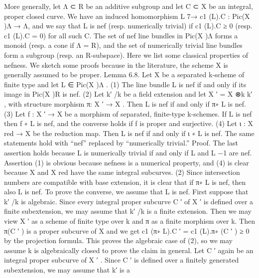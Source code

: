 \documentclass[
  10pt,
]{article}
\newenvironment{Shaded}{}{}
\newcommand{\NormalTok}[1]{#1}
\begin{document}
\begin{Shaded}
\begin{Highlighting}[]
\NormalTok{   More generally, let Λ ⊂ R be an additive subgroup and let C ⊂ X be an integral, proper}
\NormalTok{closed curve. We have an induced homomorphism L 7→ c1 (L).C : Pic(X )Λ → Λ, and we}
\NormalTok{say that L is nef (resp. numerically trivial) if c1 (L).C ≥ 0 (resp. c1 (L).C = 0) for all such C.}
\NormalTok{   The set of nef line bundles in Pic(X )Λ forms a monoid (resp. a cone if Λ = R), and the}
\NormalTok{set of numerically trivial line bundles form a subgroup (resp. an R{-}subspace).}
\NormalTok{  Here we list some classical properties of nefness. We sketch some proofs because in}
\NormalTok{the literature, the scheme X is generally assumed to be proper.}
\NormalTok{Lemma 6.8. Let X be a separated k{-}scheme of finite type and let L ∈ Pic(X )Λ .}
\NormalTok{    (1) The line bundle L is nef if and only if its image in Pic(X )R is nef.}
\NormalTok{    (2) Let k′ /k be a field extension and let X ′ = X ⊗k k′ , with structure morphism π: X ′ →}
\NormalTok{        X . Then L is nef if and only if π∗ L is nef.}
\NormalTok{    (3) Let f : X ′ → X be a morphism of separated, finite{-}type k{-}schemes. If L is nef then}
\NormalTok{        f ∗ L is nef, and the converse holds if f is proper and surjective.}
\NormalTok{    (4) Let ι : X red → X be the reduction map. Then L is nef if and only if ι ∗ L is nef.}
\NormalTok{The same statements hold with “nef” replaced by “numerically trivial.”}
\NormalTok{Proof. The last assertion holds because L is numerically trivial if and only if L and L −1}
\NormalTok{are nef. Assertion (1) is obvious because nefness is a numerical property, and (4) is clear}
\NormalTok{because X and X red have the same integral subcurves.}
\NormalTok{   (2) Since intersection numbers are compatible with base extension, it is clear that}
\NormalTok{if π∗ L is nef, then also L is nef. To prove the converse, we assume that L is nef. First}
\NormalTok{suppose that k′ /k is algebraic. Since every integral proper subcurve C ′ of X ′ is defined}
\NormalTok{over a finite subextension, we may assume that k′ /k is a finite extension. Then we may}
\NormalTok{view X ′ as a scheme of finite type over k and π as a finite morphism over k. Then π(C ′ )}
\NormalTok{is a proper subcurve of X and we get c1 (π∗ L).C ′ = c1 (L).π∗ (C ′ ) ≥ 0 by the projection}
\NormalTok{formula. This proves the algebraic case of (2), so we may assume k is algebraically}
\NormalTok{closed to prove the claim in general. Let C ′ again be an integral proper subcurve of X ′ .}
\NormalTok{Since C ′ is defined over a finitely generated subextension, we may assume that k′ is a}

\end{Highlighting}
\end{Shaded}
\end{document}

